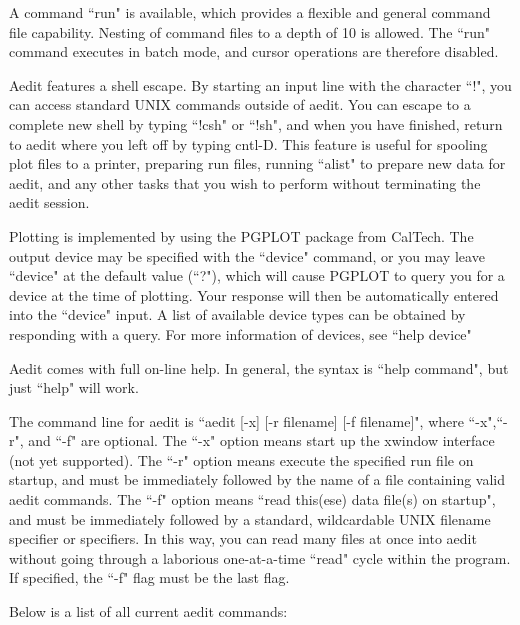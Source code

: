 A command ``run" is available, which provides a flexible and 
general command file capability.  Nesting of command files to a 
depth of 10 is allowed.  The ``run" command executes in batch mode, 
and cursor operations are therefore disabled.

Aedit features a shell escape.  By starting an input line with the
character ``!", you can access standard UNIX commands outside of
aedit.  You can escape to a complete new shell by typing ``!csh" or
``!sh", and when you have finished, return to aedit where you left
off by typing cntl-D.  This feature is useful for spooling plot
files to a printer, preparing run files, running ``alist" to prepare
new data for aedit, and any other tasks that you wish to perform
without terminating the aedit session.

Plotting is implemented by using the PGPLOT package from CalTech.
The output device may be specified with the ``device" command, or
you may leave ``device" at the default value (``?"), which will
cause PGPLOT to query you for a device at the time of plotting.
Your response will then be automatically entered into the ``device"
input.  A list of available device types can be obtained by responding
with a query.  For more information of devices, see ``help device"

Aedit comes with full on-line help.  In general, the syntax is
``help command", but just ``help" will work.

The command line for aedit is ``aedit [-x] [-r filename] [-f filename]",
where ``-x",``-r", and ``-f" are optional.  The ``-x" option means start
up the xwindow interface (not yet supported).  The ``-r" option means
execute the specified run file on startup, and must be immediately
followed by the name of a file containing valid aedit commands.  The ``-f" 
option means ``read this(ese) data file(s) on startup", and must be 
immediately followed by a standard, wildcardable UNIX filename specifier 
or specifiers.  In this way, you can read many files at once into aedit
without going through a laborious one-at-a-time ``read" cycle within
the program. If specified, the ``-f" flag must be the last flag.

Below is a list of all current aedit commands:

